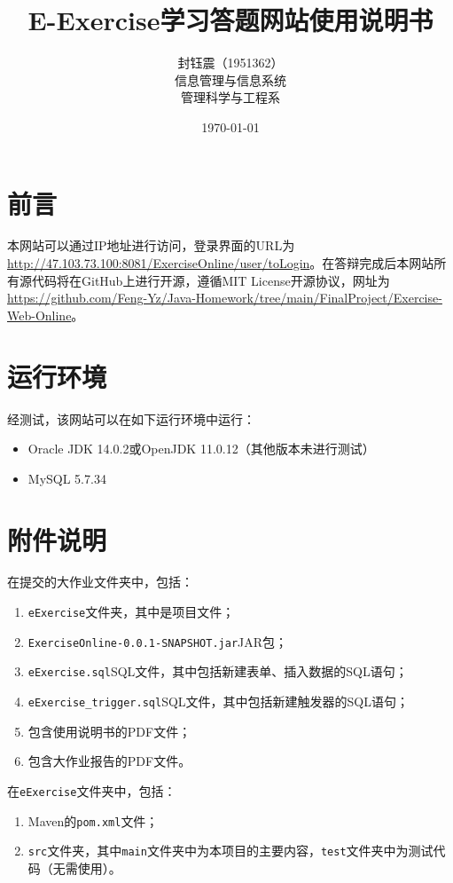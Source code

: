 \documentclass{nwafucoursepaper}
\title{\bfseries\sffamily E-Exercise学习答题网站使用说明书}
\author{\zihao{4} \fangsong 封钰震（1951362）\\\fangsong 信息管理与信息系统 \\\small \songti 管理科学与工程系}
\date{\small \today}
\begin{document}
\maketitle
\thispagestyle{empty}

\section{前言}

本网站可以通过IP地址进行访问，登录界面的URL为\url{http://47.103.73.100:8081/ExerciseOnline/user/toLogin}。在答辩完成后本网站所有源代码将在GitHub上进行开源，遵循MIT License开源协议，网址为\url{https://github.com/Feng-Yz/Java-Homework/tree/main/FinalProject/Exercise-Web-Online}。

\section{运行环境}

经测试，该网站可以在如下运行环境中运行：
\begin{itemize}
  \item Oracle JDK 14.0.2或OpenJDK 11.0.12（其他版本未进行测试）
  \item MySQL 5.7.34
\end{itemize}

\section{附件说明}

在提交的大作业文件夹中，包括：
\begin{enumerate}
  \item \verb|eExercise|文件夹，其中是项目文件；
  \item \verb|ExerciseOnline-0.0.1-SNAPSHOT.jar|JAR包；
  \item \verb|eExercise.sql|SQL文件，其中包括新建表单、插入数据的SQL语句；
  \item \verb|eExercise_trigger.sql|SQL文件，其中包括新建触发器的SQL语句；
  \item 包含使用说明书的PDF文件；
  \item 包含大作业报告的PDF文件。
\end{enumerate}

在\verb|eExercise|文件夹中，包括：
\begin{enumerate}
  \item Maven的\verb|pom.xml|文件；
  \item \verb|src|文件夹，其中\verb|main|文件夹中为本项目的主要内容，\verb|test|文件夹中为测试代码（无需使用）。
\end{enumerate}
\end{document}
